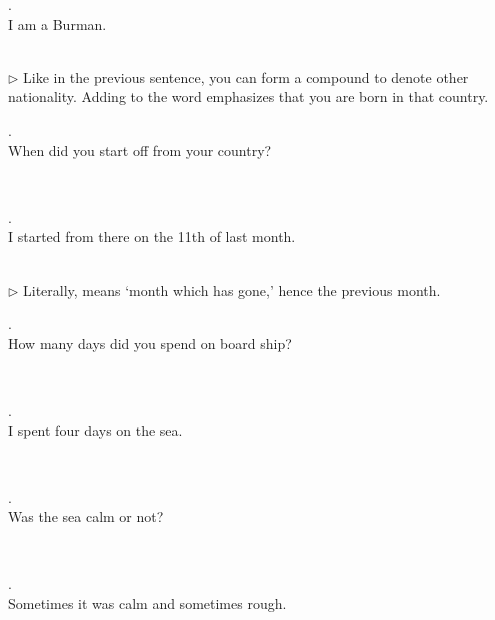 \medskip
\parbox[lt]{0.93\linewidth}{\raggedright{}. \\
\hspace*{6mm}I am a Burman.}\\[1mm]
{\small $\triangleright$ Like in the previous sentence, you can form a compound to denote other nationality. Adding  to the word emphasizes that you are born in that country.}

\medskip
\parbox[lt]{0.93\linewidth}{\raggedright{}. \\
\hspace*{6mm}When did you start off from your country?}\\[1mm]

\medskip
\parbox[lt]{0.93\linewidth}{\raggedright{}. \\
\hspace*{6mm}I started from there on the 11th of last month.}\\[1mm]
{\small $\triangleright$ Literally,  means `month which has gone,' hence the previous month.}

\medskip
\parbox[lt]{0.93\linewidth}{\raggedright{}. \\
\hspace*{6mm}How many days did you spend on board ship?}\\[1mm]

\medskip
\parbox[lt]{0.93\linewidth}{\raggedright{}. \\
\hspace*{6mm}I spent four days on the sea.}\\[1mm]

\medskip
\parbox[lt]{0.93\linewidth}{\raggedright{}. \\
\hspace*{6mm}Was the sea calm or not?}\\[1mm]

\medskip
\parbox[lt]{0.93\linewidth}{\raggedright{}. \\
\hspace*{6mm}Sometimes it was calm and sometimes rough.}\\[1mm]

